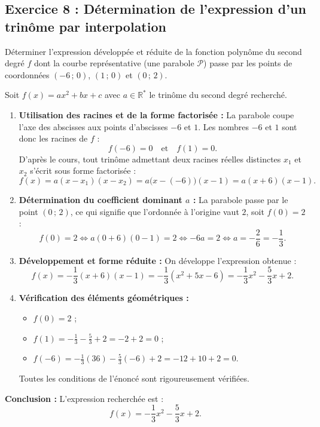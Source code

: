 \documentclass[11pt,a4paper]{article}
\newcommand{\R}{\mathbb{R}}
\begin{document}
\subsection*{Exercice 8 : Détermination de l'expression d'un trinôme par interpolation}
Déterminer l'expression développée et réduite de la fonction polynôme du second degré $f$ dont la courbe représentative (une parabole $\mathcal{P}$) passe par les points de coordonnées $(-6\,;\,0)$, $(1\,;\,0)$ et $(0\,;\,2)$.

\begin{correctionbox}
Soit $f(x) = ax^2 + bx + c$ avec $a \in \R^*$ le trinôme du second degré recherché.
\begin{enumerate}
    \item \textbf{Utilisation des racines et de la forme factorisée :}
    La parabole coupe l'axe des abscisses aux points d'abscisses $-6$ et $1$. Les nombres $-6$ et $1$ sont donc les racines de $f$ :
    \[
    f(-6) = 0 \quad \text{et} \quad f(1) = 0.
    \]
    D'après le cours, tout trinôme admettant deux racines réelles distinctes $x_1$ et $x_2$ s'écrit sous forme factorisée :
    \[
    f(x) = a(x - x_1)(x - x_2) = a\bigl(x - (-6)\bigr)(x - 1) = a(x + 6)(x - 1).
    \]

    \item \textbf{Détermination du coefficient dominant $a$ :}
    La parabole passe par le point $(0\,;\,2)$, ce qui signifie que l'ordonnée à l'origine vaut $2$, soit $f(0) = 2$ :
    \[
    f(0) = 2 \iff a(0 + 6)(0 - 1) = 2 \iff -6a = 2 \iff a = -\frac{2}{6} = -\frac{1}{3}.
    \]

    \item \textbf{Développement et forme réduite :}
    On développe l'expression obtenue :
    \[
    f(x) = -\frac{1}{3}(x + 6)(x - 1) = -\frac{1}{3}(x^2 + 5x - 6) = -\frac{1}{3}x^2 - \frac{5}{3}x + 2.
    \]

    \item \textbf{Vérification des éléments géométriques :}
    \begin{itemize}
        \item $f(0) = 2$ ;
        \item $f(1) = -\frac{1}{3} - \frac{5}{3} + 2 = -2 + 2 = 0$ ;
        \item $f(-6) = -\frac{1}{3}(36) - \frac{5}{3}(-6) + 2 = -12 + 10 + 2 = 0$.
    \end{itemize}
    Toutes les conditions de l'énoncé sont rigoureusement vérifiées.
\end{enumerate}
\textbf{Conclusion :} L'expression recherchée est :
\[
f(x) = -\frac{1}{3}x^2 - \frac{5}{3}x + 2.
\]
\end{correctionbox}
\end{document}
